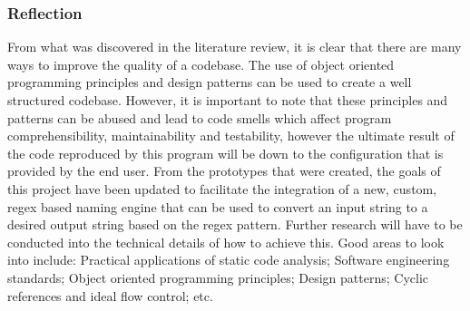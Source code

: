 \subsubsection{Reflection}
From what was discovered in the literature review, it is clear that there are many ways to improve the quality of a codebase. The use of object oriented programming principles and design patterns can be used to create a well structured codebase. However, it is important to note that these principles and patterns can be abused and lead to code smells which affect program comprehensibility, maintainability and testability, however the ultimate result of the code reproduced by this program will be down to the configuration that is provided by the end user.
From the prototypes that were created, the goals of this project have been updated to facilitate the integration of a new, custom, regex based naming engine that can be used to convert an input string to a desired output string based on the regex pattern.
Further research will have to be conducted into the technical details of how to achieve this. Good areas to look into include: Practical applications of static code analysis; Software engineering standards; Object oriented programming principles; Design patterns; Cyclic references and ideal flow control; etc.

